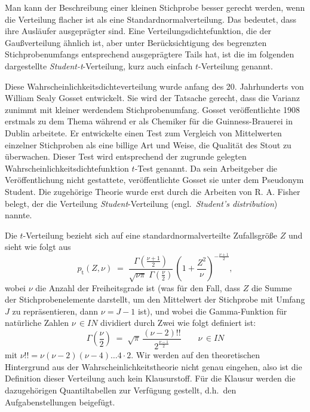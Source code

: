 
Man kann der Beschreibung einer kleinen Stichprobe besser gerecht werden, wenn die
Verteilung flacher ist als eine Standardnormalverteilung. Das bedeutet, dass ihre Ausläufer
ausgeprägter sind.
Eine Verteilungsdichtefunktion, die der Gaußverteilung ähnlich ist, aber unter
Berücksichtigung des begrenzten Stichprobenumfangs entsprechend ausgeprägtere Tails hat,
ist die im folgenden dargestellte \textsl{Student-t}-Verteilung, kurz auch
einfach $t$-Verteilung genannt.


Diese Wahrscheinlichkeitsdichteverteilung wurde anfang des 20. Jahrhunderts von
William Sealy Gosset entwickelt. Sie wird der
Tatsache gerecht, dass die Varianz zunimmt mit kleiner werdendem Stichprobenumfang.
Gosset veröffentlichte 1908 erstmals zu dem Thema während er als Chemiker für die Guinness-Brauerei
in Dublin arbeitete. Er entwickelte einen Test zum Vergleich von Mittelwerten
einzelner Stichproben als eine billige Art und Weise, die Qualität des Stout
zu überwachen. Dieser Test wird entsprechend der zugrunde gelegten Wahrscheinlichkeitsdichtefunktion
$t$-Test genannt.
Da sein Arbeitgeber die Veröffentlichung nicht gestattete, veröffentlichte Gosset sie unter
dem Pseudonym Student. Die zugehörige Theorie wurde erst durch die
Arbeiten von R. A. Fisher belegt, der die Verteilung \textsl{Student}-Verteilung (engl.\
\textsl{Student's distribution}) nannte.

Die $t$-Verteilung bezieht sich auf eine standardnormalverteilte Zufallsgröße $Z$ und sieht wie folgt aus
\begin{equation}
p_\mathrm{t}(Z,\nu) \; = \;
{\frac {\Gamma \left({\frac {\nu+1}{2}}\right)}{{\sqrt {\nu \pi }} \;
\Gamma \left({\frac {\nu}{2}}\right)}} \, \left(1+{\frac {Z^2}{\nu}}\right)^{-{\frac {\nu+1}{2}}} ,
\end{equation}
wobei $\nu$ die Anzahl der Freiheitsgrade ist (was für den Fall, dass $Z$
die Summe der Stichprobenelemente darstellt, um den Mittelwert der Stichprobe mit Umfang $J$
zu repräsentieren, dann $\nu = J-1$ ist), und wobei
die Gamma-Funktion für natürliche Zahlen $\nu \, \in I \!\! N$ dividiert durch Zwei
wie folgt definiert ist:
\begin{equation}
\Gamma \left({\frac{\nu}{2}}\right) \; = \;
\sqrt{\pi} \, \frac{(\nu-2)!!}{ 2^{\frac{\nu-1}{2}} } \qquad \nu \, \in I \!\! N
\label{GammaHalfInt}
\end{equation}
mit $\nu!! = \nu (\nu-2) (\nu-4) \dots 4 \cdot 2$.
Wir werden auf den theoretischen Hintergrund aus der Wahrscheinlichkeitstheorie nicht
genau eingehen, also ist die Definition dieser Verteilung auch kein Klausurstoff.
Für die Klausur werden die dazugehörigen Quantiltabellen zur Verfügung gestellt, d.h.\
den Aufgabenstellungen beigefügt.


